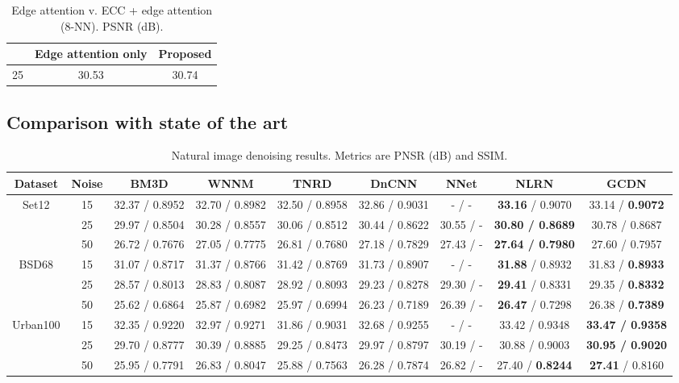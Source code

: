 \documentclass[journal]{IEEEtran}
\begin{document}
\begin{table}
\centering
\caption{Edge attention v. ECC + edge attention (8-NN). PSNR (dB).}
\begin{tabular}{ccc}
\hline
 & Edge attention only & Proposed \\ \hline
25       & 30.53 & 30.74 \\ \hline
\end{tabular}
\label{table:onlyscalar}
\end{table}


\subsection{Comparison with state of the art}

\begin{table*}[t]
\centering
\caption{Natural image denoising results. Metrics are PNSR (dB) and SSIM.}
\begin{tabular}{ccccccccc}
\hline
Dataset                   & Noise  & BM3D           & WNNM           & TNRD           & DnCNN          & NNet  & NLRN                    & \textbf{GCDN}       \\ \hline
\multirow{3}{*}{Set12}    & 15             & 32.37 / 0.8952 & 32.70 / 0.8982 & 32.50 / 0.8958 & 32.86 / 0.9031 & - / -     & \textbf{33.16} / 0.9070 & 33.14 / \textbf{0.9072}         \\
                          & 25             & 29.97 / 0.8504 & 30.28 / 0.8557 & 30.06 / 0.8512 & 30.44 / 0.8622 & 30.55 / - & \textbf{30.80 / 0.8689} & 30.78 / 0.8687          \\
                          & 50             & 26.72 / 0.7676 & 27.05 / 0.7775 & 26.81 / 0.7680 & 27.18 / 0.7829 & 27.43 / - & \textbf{27.64 / 0.7980} & 27.60 / 0.7957          \\ \hline
\multirow{3}{*}{BSD68}    & 15             & 31.07 / 0.8717 & 31.37 / 0.8766 & 31.42 / 0.8769 & 31.73 / 0.8907 & - / -     & \textbf{31.88} / 0.8932 & 31.83 / \textbf{0.8933}          \\ 
                          & 25             & 28.57 / 0.8013 & 28.83 / 0.8087 & 28.92 / 0.8093 & 29.23 / 0.8278 & 29.30 / - & \textbf{29.41} / 0.8331 & 29.35 / \textbf{0.8332} \\ 
                          & 50             & 25.62 / 0.6864 & 25.87 / 0.6982 & 25.97 / 0.6994 & 26.23 / 0.7189 & 26.39 / - & \textbf{26.47} / 0.7298 & 26.38 / \textbf{0.7389}          \\ \hline
\multirow{3}{*}{Urban100} & 15             & 32.35 / 0.9220 & 32.97 / 0.9271 & 31.86 / 0.9031 & 32.68 / 0.9255 & - / -     & 33.42 / 0.9348          & \textbf{33.47 / 0.9358} \\ 
                          & 25             & 29.70 / 0.8777 & 30.39 / 0.8885 & 29.25 / 0.8473 & 29.97 / 0.8797 & 30.19 / - & 30.88 / 0.9003 & \textbf{30.95 / 0.9020}         \\ 
                          & 50             & 25.95 / 0.7791 & 26.83 / 0.8047 & 25.88 / 0.7563 & 26.28 / 0.7874 & 26.82 / - & 27.40 / \textbf{0.8244} & \textbf{27.41} / 0.8160          \\ \hline
\end{tabular}
\label{table:results}
\end{table*}
\end{document}
